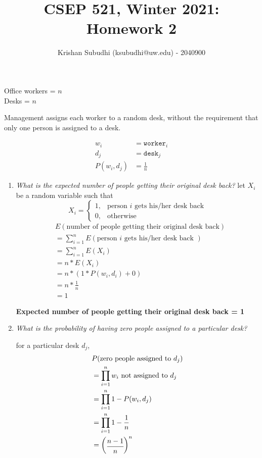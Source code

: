 \documentclass{homeworg}
\title{CSEP 521, Winter 2021: Homework 2}
\author{Krishan Subudhi (ksubudhi@uw.edu) - 2040900}
\begin{document}
\maketitle

\exercise
Office workers = $n$\\
Desks = $n$

Management assigns each worker to a random desk, without the requirement that only one person is assigned to a desk.

\begin{align*}
w_i &= \texttt{worker}_i \\
d_j &= \texttt{desk}_j \\
P(w_i, d_j) &= \frac{1}{n}
\end{align*}

\begin{enumerate}[label=\alph*)]
    \item \emph{What is the expected number of people getting their original desk back?}
    let $X_i$ be a random variable such that 
    \[
        X_i = \begin{cases}
			1, & \text{person $i$ gets his/her desk back}\\
            0, & \text{otherwise}
		 \end{cases}
    \]
    \begin{align*}
        & E(\text{number of people getting their original desk back}) \\
        & = \sum_{i=1}^n E(\text{person $i$ gets his/her desk back }) \\
        & = \sum_{i=1}^n E(X_i) \\
        & = n \ast E(X_i) \\
        & = n \ast (1 \ast P(w_i, d_i) + 0) \\
        & = n \ast \frac{1}{n}\\
        & = 1
    \end{align*}
    
    \textbf{Expected number of people getting their original desk back = 1}
    
    \item \emph{What is the probability of having zero people assigned to a particular desk?}
    
    for a particular desk $d_j$,
    \begin{align*}
        & P(\text{zero people assigned to}\ d_j) \\
        & = \prod_{i = 1}^{n} w_i \text{ not assigned to}\ d_j \\
        & = \prod_{i = 1}^{n} 1- P(w_i, d_j)\\
        & = \prod_{i = 1}^{n} 1-\frac{1}{n}\\
        & = \begin{pmatrix}
                \cfrac{n-1}{n}
            \end{pmatrix}^n
    \end{align*}
    

\end{enumerate}
\end{document}
